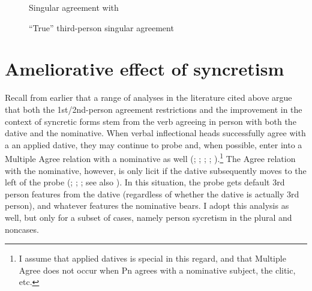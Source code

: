 \documentclass[output=paper]{langscibook}
\begin{document}
\begin{figure}
  \begin{floatrow}
    \captionsetup{margin=.1\linewidth}
            {\caption{Singular agreement with \sti}}
            {\caption{“True” third-person singular agreement}}%
  \end{floatrow}
\end{figure}


\section{Ameliorative effect of \sti syncretism}



Recall from earlier that a range of analyses in the literature cited above argue that both the 1st/2nd-person agreement restrictions and the improvement in the context of syncretic forms stem from the verb agreeing in person with both the dative and the nominative.  When verbal inflectional heads successfully agree with a an applied dative, they may continue to probe and, when possible, enter into a Multiple Agree relation with a nominative as well (\citealt{Schutze:2003mh}; \citealt{SigurTHsson:2008dm}; \citealt{Ussery:2009jd}; \citealt{atlamaz2018partial}; \citealt{CoonKeine2020}).\footnote{I assume that applied datives is special in this regard, and that Multiple Agree does not occur when Pn agrees with a nominative subject, the \sti clitic, etc.}  The Agree relation with the nominative, however, is only licit if the dative subsequently moves to the left of the probe (\citealt{Holmberg:2004gk}; \citealt{Kucerova:2007nn,kucerova2016long}; \citealt{SigurTHsson:2008dm}; see also \citealt{Chomsky:2008od}). In this situation, the probe gets default 3rd person features from the dative (regardless of whether the dative is actually 3rd person), and whatever features the nominative bears. I adopt this analysis as well, but only for a subset of cases, namely person sycretism in the plural and non\sti cases.
\end{document}

